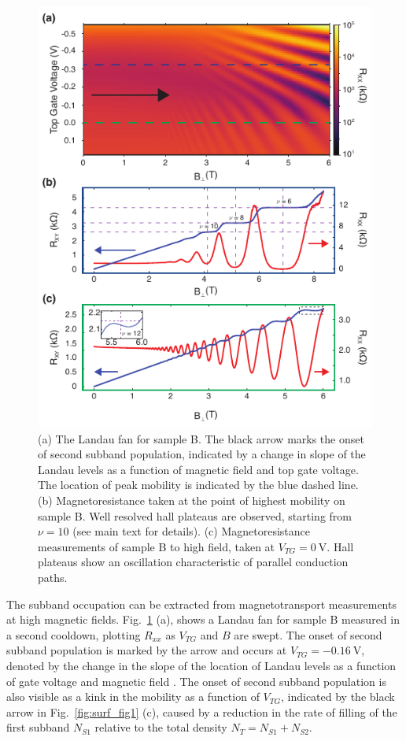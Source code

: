 \begin{figure}
    \includegraphics[width=0.6\linewidth]{Figure2}
    \caption[Magnetoresistance measurements and Landau fan for sample B]{\label{fig:surf_fig2}(a) The Landau fan for sample B. The black arrow marks the onset of second subband population, indicated by a change in slope of the Landau levels as a function of magnetic field and top gate voltage. The location of peak mobility is indicated by the blue dashed line. (b) Magnetoresistance taken at the point of highest mobility on sample B. Well resolved hall plateaus are observed, starting from $\nu = 10$ (see main text for details). (c) Magnetoresistance measurements of sample B to high field, taken at $V_{TG} = \SI{0}{\volt}$. Hall plateaus show an oscillation characteristic of parallel conduction paths. }
\end{figure}

The subband occupation can be extracted from magnetotransport measurements at high magnetic fields. Fig.~\ref{fig:surf_fig2} (a), shows a Landau fan for sample B measured in a second cooldown, plotting $R_{xx}$ as $V_{TG}$ and $B$ are swept.  The onset of second subband population is marked by the arrow and occurs at $V_{TG} = \SI{-0.16}{\volt}$, denoted by the change in the slope of the location of Landau levels as a function of gate voltage and magnetic field \cite{PhysRevB.74.195313,STORMER1982707}. The onset of second subband population is also visible as a kink in the mobility as a function of $V_{TG}$, indicated by the black arrow in Fig.~\ref{fig:surf_fig1} (c), caused by a reduction in the rate of filling of the first subband $N_{S1}$ relative to the total density $N_T = N_{S1} + N_{S2}$.

